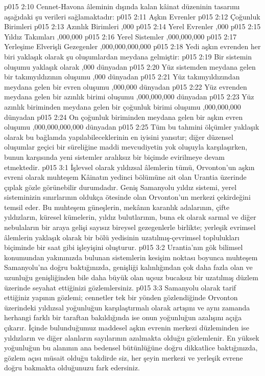 \vs p015 2:10 Cennet\hyp{}Havona âleminin dışında kalan kâinat düzeninin tasarımı aşağıdaki şu verileri sağlamaktadır:
\vs p015 2:11 Aşkın Evrenler 
\vs p015 2:12 Çoğunluk Birimleri 
\vs p015 2:13 Azınlık Birimleri ,000
\vs p015 2:14 Yerel Evrenler ,000
\vs p015 2:15 Yıldız Takımları ,000,000
\vs p015 2:16 Yerel Sistemler ,000,000,000
\vs p015 2:17 Yerleşime Elverişli Gezegenler ,000,000,000,000
\vs p015 2:18 Yedi aşkın evrenden her biri yaklaşık olarak şu oluşumlardan meydana gelmiştir:
\vs p015 2:19 Bir sistemin oluşumu yaklaşık olarak ,000 dünyadan
\vs p015 2:20 Yüz sistemden meydana gelen bir takımyıldızının oluşumu ,000 dünyadan
\vs p015 2:21 Yüz takımyıldızından meydana gelen bir evren oluşumu ,000,000 dünyadan
\vs p015 2:22 Yüz evrenden meydana gelen bir azınlık birimi oluşumu ,000,000,000 dünyadan
\vs p015 2:23 Yüz azınlık biriminden meydana gelen bir çoğunluk birimi oluşumu ,000,000,000 dünyadan
\vs p015 2:24 On çoğunluk biriminden meydana gelen bir aşkın evren oluşumu ,000,000,000,000 dünyadan
\vs p015 2:25 Tüm bu tahmini ölçümler yaklaşık olarak bu bağlamda yapılabileceklerinin en iyisini yansıtır; diğer düzensel oluşumlar geçici bir süreliğine maddi mevcudiyetin yok oluşuyla karşılaşırken, bunun karşısında yeni sistemler aralıksız bir biçimde evirilmeye devam etmektedir.
\vs p015 3:1 İşlevsel olarak yıldızsal âlemlerin tümü, Orvonton’un aşkın evreni olarak muhteşem Kâinatın yedinci bölümüne ait olan Urantia üzerinde çıplak gözle görünebilir durumdadır. Geniş Samanyolu yıldız sistemi, yerel sisteminizin sınırlarının oldukça ötesinde olan Orvonton’un merkezi çekirdeğini temsil eder. Bu muhteşem güneşlerin, mekânın karanlık adalarının, çifte yıldızların, küresel kümelerin, yıldız bulutlarının, buna ek olarak sarmal ve diğer nebulaların bir araya gelişi sayısız bireysel gezegenlerle birlikte; yerleşik evrimsel âlemlerin yaklaşık olarak bir bölü yedisinin uzatılmış\hyp{}çevrimsel toplulukları biçiminde bir saat gibi işleyişini oluşturur.
\vs p015 3:2 Urantia’nın gök bilimsel konumundan yakınınızda bulunan sistemlerin kesişim noktası boyunca muhteşem Samanyolu’na doğru baktığınızda, genişliği kalınlığından çok daha fazla olan ve uzunluğu genişliğinden bile daha büyük olan uçsuz bucaksız bir uzatılmış düzlem üzerinde seyahat ettiğinizi gözlemlersiniz.
\vs p015 3:3 Samanyolu olarak tarif ettiğiniz yapının gözlemi; cennetler tek bir yönden gözlendiğinde Orvonton üzerindeki yıldızsal yoğunluğun karşılaştırmalı olarak artışını ve aynı zamanda herhangi farklı bir taraftan bakıldığında ise onun yoğunluğun azalışını açığa çıkarır. İçinde bulunduğumuz maddesel aşkın evrenin merkezi düzleminden ise yıldızların ve diğer alanların sayılarının azalmakta olduğu gözlemlenir. En yüksek yoğunluğun bu alanının ana bedensel bütünlüğüne doğru dikkatlice baktığınızda, gözlem açısı müsait olduğu takdirde siz, her şeyin merkezi ve yerleşik evrene doğru bakmakta olduğunuzu fark edersiniz.
